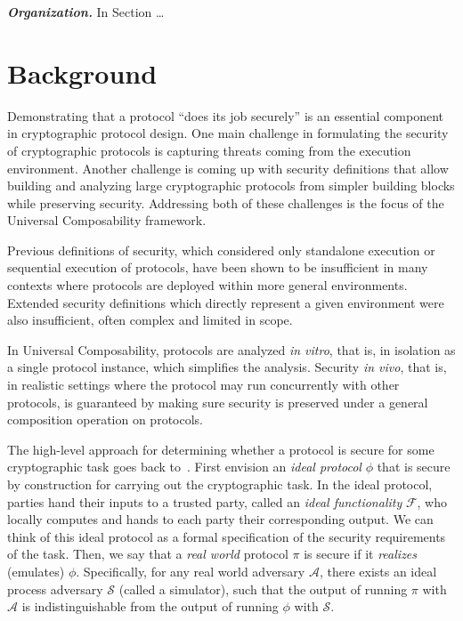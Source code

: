 \documentclass{llncs}
\newcommand{\mc}[1]{\mathcal{{#1}}}
\newcommand{\parheader}[1]{\noindent\emph{\textbf{{#1}.}}}
\begin{document}
\parheader{Organization} In Section \ldots

\section{Background}

Demonstrating that a protocol ``does its job securely'' is an essential component in
cryptographic protocol design. One main challenge in formulating the security of
cryptographic protocols is capturing threats coming from the execution
environment. Another challenge is coming up with security definitions that allow
building and analyzing large cryptographic protocols from simpler building
blocks while preserving security. Addressing both of these challenges is the focus of
the Universal Composability framework.

Previous definitions of security, which considered only standalone execution or
sequential execution of protocols, have been shown to be insufficient in many
contexts where protocols are deployed within more general environments. Extended
security definitions which directly represent a given environment were also
insufficient, often complex and limited in scope.

In Universal Composability, protocols are analyzed \emph{in vitro}, that is, in
isolation as a single protocol instance, which simplifies the
analysis. Security \emph{in vivo}, that is, in realistic settings where the
protocol may run concurrently with other protocols, is guaranteed by making sure
security is preserved under a general composition operation on protocols.

The high-level approach for determining whether a protocol is secure for some
cryptographic task goes back to~\cite{goldreich1987play}. First envision
an \emph{ideal protocol} $\phi$ that is secure by construction for carrying out the cryptographic task. In the ideal protocol, parties hand their
inputs to a trusted party, called an \emph{ideal functionality} $\mc{F}$, who locally
computes and hands to each party their corresponding output. We can think of
this ideal protocol as a formal specification of the security
requirements of the task. Then, we say that a \emph{real world} protocol $\pi$
is secure if it \emph{realizes} (emulates) $\phi$. Specifically, for any
real world adversary $\mc{A}$, there exists an ideal process adversary $\mc{S}$
(called a simulator), such that the output of running $\pi$ with $\mc{A}$ is
indistinguishable from the output of running $\phi$ with $\mc{S}$.
\end{document}

